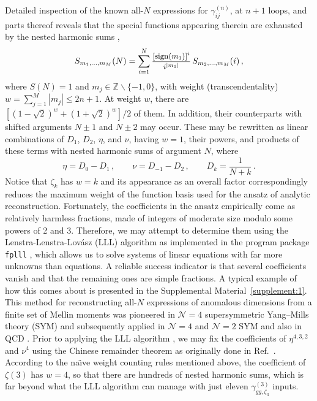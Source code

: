 \documentclass[
 twocolumn,
 superscriptaddress,
 preprintnumbers,
 nofootinbib,
 amsmath,amssymb,
 aps,
 prl
 ]{revtex4-2}
\newcommand{\sign}{\mathop{\mathrm{sign}}\nolimits}
\def\frct#1#2{\mbox{\small{$\displaystyle\frac{#1}{#2}$}}}
\begin{document}
Detailed inspection of the known all-$N$ expressions for $\gamma_{ij}^{(n)}$, at $n+1$ loops, and parts thereof reveals that the special functions appearing therein are exhausted by the nested harmonic sums \cite{Vermaseren:1998uu},
\begin{equation}
S_{m_1,\ldots,m_M}(N)=\sum^{N}_{i=1} \frct{[\sign(m_1)]^{i}}{i^{\vert m_1\vert}}
\,S_{m_2,\ldots,m_M}(i)\,,
\label{eq:hs}
\end{equation}
where $S(N)=1$ and $m_j\in\mathbb{Z}\backslash\{-1,0\}$, with weight (transcendentality) $w=\sum_{j=1}^M|m_j|\le2n+1$.
At weight $w$, there are $[(1-\sqrt{2})^w+(1+\sqrt{2})^w]/2$ of them.
In addition, their counterparts with shifted arguments $N\pm1$ and $N\pm2$ may occur.
These may be rewritten as linear combinations of $D_1$, $D_2$, $\eta$, and $\nu$, having $w=1$, their powers, and products of these terms with nested harmonic sums of argument $N$, where
\begin{equation}
\eta=D_0-D_1\,,\qquad \nu=D_{-1}-D_2\,,\qquad D_k=\frac{1}{N+k}\,.
\label{eq:etanu}
\end{equation}
Notice that $\zeta_k$ has $w=k$ and its appearance as an overall factor correspondingly reduces the maximum weight of the function basis used for the ansatz of analytic reconstruction.
Fortunately, the coefficients in the ansatz empirically come as relatively harmless fractions, made of integers of moderate size modulo some powers of 2 and 3.
Therefore, we may attempt to determine them using the Lenstra-Lenstra-Lov\'{a}sz (LLL) algorithm \cite{Lenstra82factoringpolynomials} as implemented in the program package \texttt{fplll} \cite{fplll}, which allows us to solve systems of
linear equations with far more unknowns than equations.
A reliable success indicator is that several coefficients vanish and that the remaining ones are simple fractions.
A typical example of how this comes about is presented in the Supplemental Material~\ref{supplement:1}.
This method for reconstructing all-$N$ expressions of anomalous dimensions from a finite set of Mellin moments was pioneered in $\mathcal{N}=4$ supersymmetric Yang--Mills theory (SYM) \cite{Velizhanin:2010cm} and subsequently applied in ${\mathcal N}=4$ \cite{Velizhanin:2013vla,Marboe:2014sya,Marboe:2016igj,Kniehl:2020rip,Kniehl:2021ysp,Velizhanin:2021bdh,Kniehl:2023bbk,Kniehl:2024tvd} and $\mathcal{N}=2$ SYM \cite{Kniehl:2023bbk} and also in QCD \cite{Velizhanin:2012nm,Davies:2016jie,Moch:2017uml,Kniehl:2025jfs,Kniehl:2025ttz,Falcioni:2025hfz,Kniehl:2026axe}.
Prior to applying the LLL algorithm \cite{Lenstra82factoringpolynomials,fplll}, we may fix the coefficients of $\eta^{4,3,2}$ and $\nu^4$ using the Chinese remainder theorem \cite{china} as originally done in Ref.~\cite{Moch:2014sna}.
According to the na\"{\i}ve weight counting rules mentioned above, the coefficient of $\zeta(3)$ has $w=4$, so that there are hundreds of nested harmonic sums, which is far beyond what the LLL algorithm can manage with just eleven $\gamma_{gg,\zeta_3}^{(3)}$ inputs.
\end{document}
